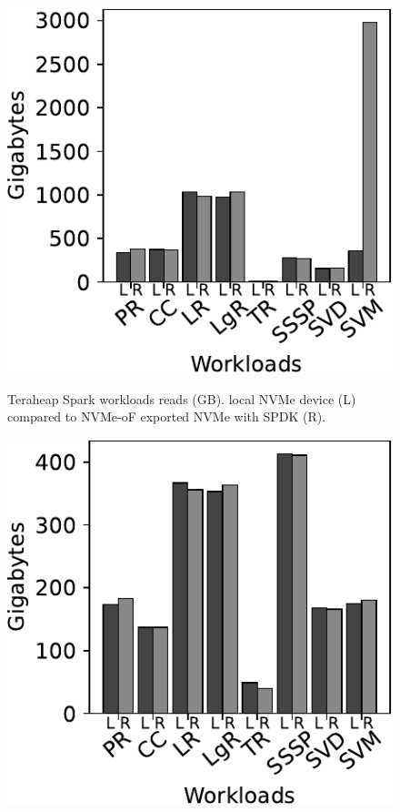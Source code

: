 {\begin{figure}[H]
  \includegraphics[width=\linewidth]{figures/spark_r.pdf}\\
\caption{Teraheap Spark workloads reads (GB). local NVMe device (L) compared to NVMe-oF exported NVMe with SPDK (R).}
\label{fig:spark_r}
\end{figure}
\begin{figure}[H]
  \includegraphics[width=\linewidth]{figures/spark_w.pdf}\\

\end{figure}}
